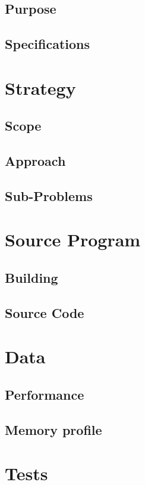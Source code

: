 \documentclass[a4paper,11pt,oneside]{article}
\begin{document}
    \subsection{Purpose}
    \subsection{Specifications}

  \section{Strategy}
    \subsection{Scope}
    \subsection{Approach}
	  \subsection{Sub-Problems}

  \section{Source Program}
    \subsection{Building}
    \subsection{Source Code}
    

  \section{Data}
  	\subsection{Performance}
    \subsection{Memory profile}

  \section{Tests}
\end{document}
